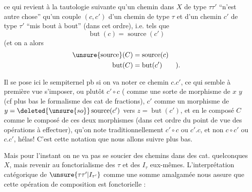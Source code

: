

ce qui  revient à la tautologie suivante qu'un chemin  dans $X$ de type $\tau\tau'$ ``n'est autre chose'' qu'un couple $(c,c')$ d'un chemin  de type $\tau$ et d'un chemin $c'$ de type $\tau'$ ``mis bout à bout'' (dans cet ordre), i.e. tels que
\[
\operatorname{but}(c)=\operatorname{source}(c')
\]
(et on a alors
\[
\begin{aligned}
\operatorname{\unsure{source}}(C)&=\operatorname{source}(c)\\
\operatorname{but}(C)&=\operatorname{but}(c')\qquad ).
\end{aligned}
\]

Il se pose ici le sempiternel pb si on va noter ce chemin $c.c'$, ce qui semble à première vue s'imposer, ou plutôt $c'\circ c$ (   comme une  sorte de morphisme de $x$  $y$  (cf plus bas le formalisme des cat de fractions), $c'$ comme un morphisme de $y=\deleted{\unsure{so}}\operatorname{source}(c')$ vers $z=\operatorname{but}(c')$, et en  le composé $C$ comme le composé de ces deux morphismes  (dans cet ordre du point de vue des opérations à effectuer), qu'on note traditionnellement $c'\circ c$ ou $c'.c$, et non $c\circ c'$ ou $c.c'$, hélas! C'est cette notation que nous allons suivre plus bas.

Mais pour l'instant on ne va pas se soucier des chemins dans des cat. quelconques $X$, mais revenir au fonctorialisme des $\tau$ et des $I_\tau$ eux-mêmes. L'interprétation catégorique de $\unsure{\tau\tau'|I_{\tau'}}$ comme une somme amalgamée nous assure que cette opération de composition est fonctorielle :
